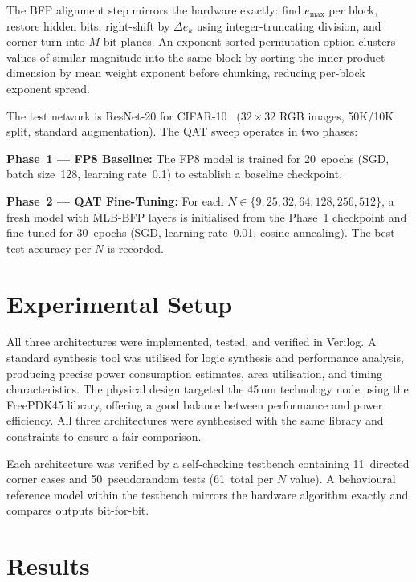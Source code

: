 \documentclass[conference]{IEEEtran}
\begin{document}
The BFP alignment step mirrors the hardware exactly: find
$e_{\max}$ per block, restore hidden bits, right-shift by
$\Delta e_k$ using integer-truncating division, and corner-turn
into $M$ bit-planes.  An exponent-sorted permutation option
clusters values of similar magnitude into the same block by
sorting the inner-product dimension by mean weight exponent before
chunking, reducing per-block exponent spread.

The test network is ResNet-20 for CIFAR-10~\cite{b_resnet} ($32
\times 32$ RGB images, 50K/10K split, standard augmentation).
The QAT sweep operates in two phases:

\textbf{Phase~1 --- FP8 Baseline:} The FP8 model is trained for
20~epochs (SGD, batch size~128, learning rate~0.1) to establish a
baseline checkpoint.

\textbf{Phase~2 --- QAT Fine-Tuning:} For each
$N \in \{9, 25, 32, 64, 128, 256, 512\}$, a fresh model with
MLB-BFP layers is initialised from the Phase~1 checkpoint and
fine-tuned for 30~epochs (SGD, learning rate~0.01, cosine
annealing).  The best test accuracy per $N$ is recorded.

\section{Experimental Setup}
\label{sec:experimental}

All three architectures were implemented, tested, and verified in
Verilog.  A standard synthesis tool was utilised for logic
synthesis and performance analysis, producing precise power
consumption estimates, area utilisation, and timing
characteristics.  The physical design targeted the 45\,nm
technology node using the FreePDK45 library, offering a good
balance between performance and power efficiency.  All three
architectures were synthesised with the same library and
constraints to ensure a fair comparison.

Each architecture was verified by a self-checking testbench
containing 11~directed corner cases and 50~pseudorandom tests
(61~total per $N$ value).  A behavioural reference model within
the testbench mirrors the hardware algorithm exactly and compares
outputs bit-for-bit.

\section{Results}
\label{sec:results}
\end{document}
